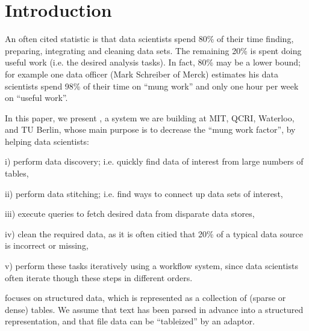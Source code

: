\section{Introduction}
\label{introduction}

An often cited statistic is that data scientists spend 80\% of their time finding, preparing, integrating and cleaning data sets. The remaining 20\% is spent doing useful work (i.e. the desired analysis tasks). In fact, 80\% may be a lower bound; for example one data officer (Mark Schreiber of Merck) estimates his data scientists spend 98\% of their time on ``mung work'' and only one hour per week on ``useful work''. 

In this paper, we present \dcv, a system we are building at MIT, QCRI, Waterloo, and TU Berlin, whose main purpose is to decrease the ``mung work factor'', by helping data scientists:

\vspace{.5em}

\noindent i) perform data discovery; i.e. quickly find data of interest from large numbers of tables, 

\vspace{.5em}

\noindent ii) perform data stitching; i.e. find ways to connect up data sets of interest, 

\vspace{.5em}

\noindent iii) execute queries to fetch desired data from disparate data stores, 

\vspace{.5em}

\noindent iv) clean the required data, as it is often citied that 20\% of a typical data source is incorrect or missing,

\vspace{.5em}

\noindent v) perform these tasks iteratively using a workflow system, since data scientists often iterate though these steps in different orders. 

\vspace{.5em}

\dcv focuses on structured data, which is represented as a collection of (sparse or dense) tables.  We assume that text has been parsed in advance into a structured representation, and that file data can be “tableized” by an adaptor.

